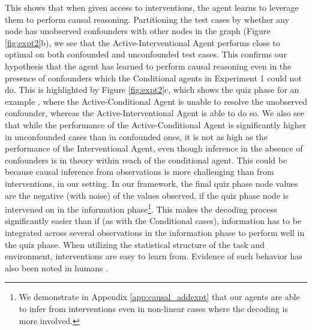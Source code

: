 This shows that when given access to interventions, the agent learns to leverage them to perform causal reasoning. Partitioning the test cases by whether any node has unobserved confounders with other nodes in the graph (Figure \ref{fig:expt2}b), we see that the Active-Interventional Agent performs close to optimal on both confounded and unconfounded test cases. This confirms our hypothesis that the agent has learned to perform causal reasoning even in the presence of confounders which the Conditional agents in Experiment 1 could not do. This is highlighted by Figure \ref{fig:expt2}c, which shows the quiz phase for an example \CBN, where the Active-Conditional Agent is unable to resolve the unobserved confounder, whereas the Active-Interventional Agent is able to do so. We also see that while the performance of the Active-Conditional Agent is significantly higher in unconfounded cases than in confounded ones, it is not as high as the performance of the Interventional Agent, even though inference in the absence of confounders is in theory within reach of the conditional agent. This could be because causal inference from observations is more challenging than from interventions, in our setting. In our framework, the final quiz phase node values are the negative (with noise) of the values observed, if the quiz phase node is intervened on in the information phase\footnote{We demonstrate in Appendix \ref{app:causal_addexpt} that our agents are able to infer from interventions even in non-linear cases where the decoding is more involved.}. This makes the decoding process significantly easier than if (as with the Conditional cases), information has to be integrated across several observations in the information phase to perform well in the quiz phase. When utilizing the statistical structure of the task and environment, interventions are easy to learn from. Evidence of such behavior has also been noted in humans \citep{fernbach2013cognitive, fernbach2010neglect}.



